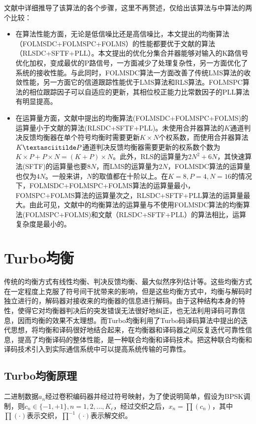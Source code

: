 文献中详细推导了该算法的各个步骤，这里不再赘述，仅给出该算法与中算法的两个比较：
\begin{itemize}
    \item
        在算法性能方面，无论是低信噪比还是高信噪比，本文提出的均衡算法（FOLMSDC+FOLMSPC+FOLMS）的性能都要优于文献的算法（RLSDC+SFTF+PLL）。本文提出的优化分集合并器能够对输入的K路信号优化加权，变成最优的P路信号，一方面减少了处理复杂性，另一方面优化了系统的接收性能。与此同时，FOLMSDC算法一方面改善了传统LMS算法的收敛性能，另一方面它的信道跟踪性能优于LMS算法和RLS算法。FOLMSPC算法的相位跟踪因子可以自适应的更新，其相位校正能力比常数因子的PLL算法有明显提高。
    \item
        在运算量方面，文献中提出的均衡算法(FOLMSDC+FOLMSPC+FOLMS)的运算量小于文献的算法(RLSDC+SFTF+PLL)。未使用合并器算法的$K$通道判决反馈均衡器在单个符号均衡时需要更新$K\times
        N$个权系数，而使用合并器算法$K\textasciitilde
        P$通道判决反馈均衡器需要更新的权系数个数为$K\times P+P\times
        N=(K+P)\times
        N$。此外，RLS的运算量为$2N^2+6N$，其快速算法(SFTF)的运算量也要$8N$，而LMS的运算量为$2N$，FOLMSDC算法的运算量也仅为$4N$。一般来讲，$N$的取值都在十阶以上。在$K=8,P=4,N=16$的情况下，FOLMSDC+FOLMSPC+FOLMS算法的运算量最小，FOMSPC+FOLMS算法的运算量次之，RLSDC+SFTF+PLL算法的运算量最大。由此可见，文献中的均衡算法的运算量与不使用FOLMSDC算法的均衡算法(FOLMSPC+FOLMS)和文献（RLSDC+SFTF+PLL）的算法相比，运算复杂度是最小的。
\end{itemize}
\section{Turbo均衡}
传统的均衡方式有线性均衡、判决反馈均衡、最大似然序列估计等。这些均衡方式在一定程度上克服了符号间干扰带来的影响，但是这些均衡方式中，均衡与解码时独立进行的，解码器对接收来的均衡器的信息进行解码。由于这种结构本身的特性，使得它对均衡器判决后的突发错误无法很好地纠正，也无法利用译码可靠信息，因而均衡的效果不太理想。而Turbo均衡利用了Turbo码译码算法中提出的迭代思想，将均衡和译码很好地结合起来，在均衡器和译码器之间反复迭代可靠性信息，提高了均衡译码的整体性能，是一种联合均衡和译码技术。把这种联合均衡和译码技术引入到实际通信系统中可以提高系统传输的可靠性。
\subsection{Turbo均衡原理}
二进制数据$a_n$经过卷积编码器并经过符号映射，为了使说明简单，假设为BPSK调制，则$c_n\in\{-1,+1\},n=1,2,\ldots,K_c$，经过交织之后，$x_n=\prod(c_n)$，其中$\prod(\cdot)$表示交织，$\prod^{-1}(\cdot)$表示解交织。

